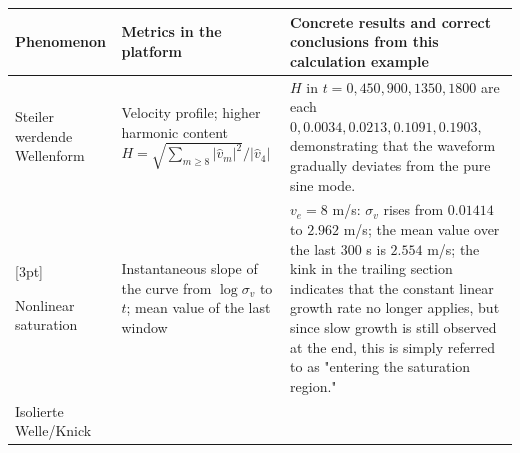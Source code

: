 \documentclass[11pt,a4paper,openany]{book}
\numberwithin{equation}{chapter}
\numberwithin{figure}{chapter}
\numberwithin{table}{chapter}
\begin{document}
\begin{center}
\small
{}
\label{tab:nonlinear-observables}
\begin{tabular}{p{2.7cm}p{4.4cm}p{6.1cm}}
\toprule
\textbf{Phenomenon} & \textbf{Metrics in the platform} & \textbf{Concrete results and correct conclusions from this calculation example} \\
\midrule


Steiler werdende Wellenform




&






Velocity profile; higher harmonic content $H=\sqrt{\sum_{m\ge8}|\hat v_m|^2}/|\hat v_4|$
&$H$ in $t=0,450,900,1350,1800$ are each $0,0.0034,0.0213,0.1091,0.1903$, demonstrating that the waveform gradually deviates from the pure sine mode.





\\

[3pt]

Nonlinear saturation






&






Instantaneous slope of the curve from $\log\sigma_v$ to $t$; mean value of the last window






&






$v_e=8$ m/s: $\sigma_v$ rises from $0.01414$ to $2.962$ m/s; the mean value over the last 300 s is $2.554$ m/s; the kink in the trailing section indicates that the constant linear growth rate no longer applies, but since slow growth is still observed at the end, this is simply referred to as "entering the saturation region."





\\[3pt]

Isolierte Welle/Knick




&







\end{tabular}
\end{center}
\end{document}
